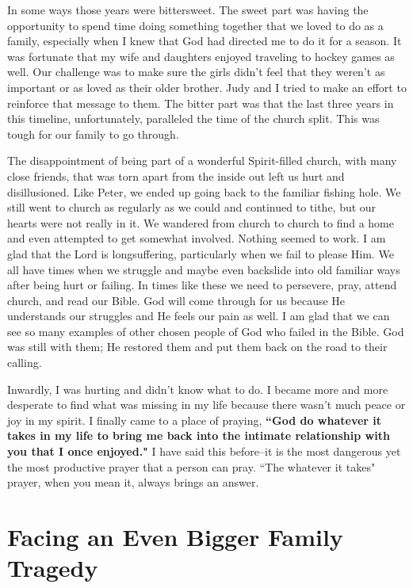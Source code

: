 \documentclass[oneside]{book}
\begin{document}
In some ways those years were bittersweet. The sweet part was having the opportunity to spend time doing something together that we loved to do as a family, especially when I knew that God had directed me to do it for a season. It was fortunate that my wife and daughters enjoyed traveling to hockey games as well. Our challenge was to make sure the girls didn't feel that they weren't as important or as loved as their older brother. Judy and I tried to make an effort to reinforce that message to them. The bitter part was that the last three years in this timeline, unfortunately, paralleled the time of the church split. This was tough for our family to go through.

The disappointment of being part of a wonderful Spirit-filled church, with many close friends, that was torn apart from the inside out left us hurt and disillusioned. Like Peter, we ended up going back to the familiar fishing hole. We still went to church as regularly as we could and continued to tithe, but our hearts were not really in it. We wandered from church to church to find a home and even attempted to get somewhat involved. Nothing seemed to work. I am glad that the Lord is longsuffering, particularly when we fail to please Him. We all have times when we struggle and maybe even backslide into old familiar ways after being hurt or failing. In times like these we need to persevere, pray, attend church, and read our Bible. God will come through for us because He understands our struggles and He feels our pain as well. I am glad that we can see so many examples of other chosen people of God who failed in the Bible. God was still with them; He restored them and put them back on the road to their calling.

Inwardly, I was hurting and didn't know what to do. I became more and more desperate to find what was missing in my life because there wasn't much peace or joy in my spirit. I finally came to a place of praying, \textbf{``God do whatever it takes in my life to bring me back into the intimate relationship with you that I once enjoyed."} I have said this before--it is the most dangerous yet the most productive prayer that a person can pray. ``The whatever it takes" prayer, when you mean it, always brings an answer.


\section{Facing an Even Bigger Family Tragedy}
\
\end{document}
